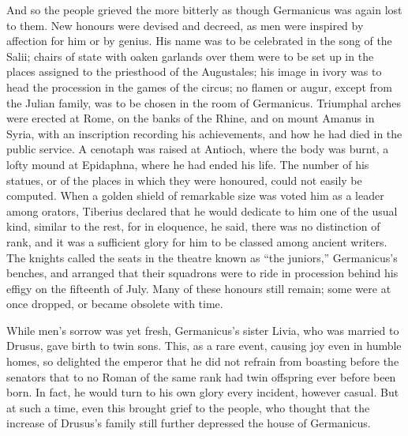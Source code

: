 
And so the people grieved the more bitterly as though Germanicus was again lost to them. New honours were devised and decreed, as men were inspired by affection for him or by genius. His name was to be celebrated in the song of the Salii; chairs of state with oaken garlands over them were to be set up in the places assigned to the priesthood of the Augustales; his image in ivory was to head the procession in the games of the circus; no flamen or augur, except from the Julian family, was to be chosen in the room of Germanicus. Triumphal arches were erected at Rome, on the banks of the Rhine, and on mount Amanus in Syria, with an inscription recording his achievements, and how he had died in the public service. A cenotaph was raised at Antioch, where the body was burnt, a lofty mound at Epidaphna, where he had ended his life. The number of his statues, or of the places in which they were honoured, could not easily be computed. When a golden shield of remarkable size was voted him as a leader among orators, Tiberius declared that he would dedicate to him one of the usual kind, similar to the rest, for in eloquence, he said, there was no distinction of rank, and it was a sufficient glory for him to be classed among ancient writers. The knights called the seats in the theatre known as ``the juniors,'' Germanicus's benches, and arranged that their squadrons were to ride in procession behind his effigy on the fifteenth of July. Many of these honours still remain; some were at once dropped, or became obsolete with time.


While men's sorrow was yet fresh, Germanicus's sister Livia, who was married to Drusus, gave birth to twin sons. This, as a rare event, causing joy even in humble homes, so delighted the emperor that he did not refrain from boasting before the senators that to no Roman of the same rank had twin offspring ever before been born. In fact, he would turn to his own glory every incident, however casual. But at such a time, even this brought grief to the people, who thought that the increase of Drusus's family still further depressed the house of Germanicus.


